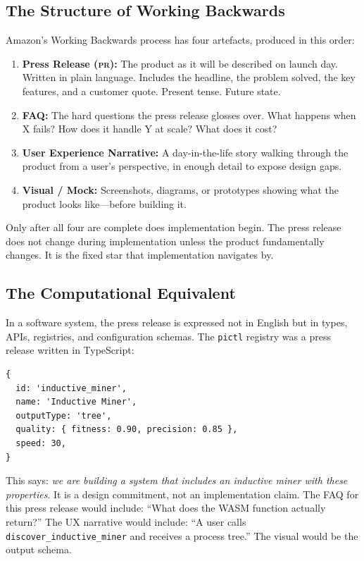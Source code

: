 \documentclass[11pt,a4paper]{article}
\newcommand{\code}[1]{\texttt{#1}}
\newcommand{\pr}{\textsc{pr}}
\begin{document}
\subsection{The Structure of Working Backwards}

Amazon's Working Backwards process has four artefacts, produced in this order:

\begin{enumerate}
  \item \textbf{Press Release (\pr):} The product as it will be described on
    launch day.  Written in plain language.  Includes the headline, the
    problem solved, the key features, and a customer quote.  Present tense.
    Future state.

  \item \textbf{FAQ:} The hard questions the press release glosses over.
    What happens when X fails?  How does it handle Y at scale?  What does
    it cost?

  \item \textbf{User Experience Narrative:} A day-in-the-life story walking
    through the product from a user's perspective, in enough detail to expose
    design gaps.

  \item \textbf{Visual / Mock:} Screenshots, diagrams, or prototypes showing
    what the product looks like---before building it.
\end{enumerate}

Only after all four are complete does implementation begin.  The press release
does not change during implementation unless the product fundamentally changes.
It is the fixed star that implementation navigates by.

\subsection{The Computational Equivalent}

In a software system, the press release is expressed not in English but in
types, APIs, registries, and configuration schemas.  The \code{pictl} registry
was a press release written in TypeScript:

\begin{lstlisting}
{
  id: 'inductive_miner',
  name: 'Inductive Miner',
  outputType: 'tree',
  quality: { fitness: 0.90, precision: 0.85 },
  speed: 30,
}
\end{lstlisting}

This says: \emph{we are building a system that includes an inductive miner with
these properties}.  It is a design commitment, not an implementation claim.
The FAQ for this press release would include: ``What does the WASM function
actually return?''  The UX narrative would include: ``A user calls
\code{discover\_inductive\_miner} and receives a process tree.''  The visual
would be the output schema.
\end{document}
